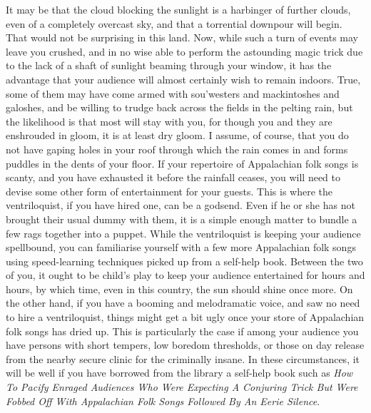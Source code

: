 It may be that the cloud blocking the sunlight is a harbinger of further clouds, even of a completely overcast sky, and that a torrential downpour will begin. That would not be surprising in this land. Now, while such a turn of events may leave you crushed, and in no wise able to perform the astounding magic trick due to the lack of a shaft of sunlight beaming through your window, it has the advantage that your audience will almost certainly wish to remain indoors. True, some of them may have come armed with sou'westers and mackintoshes and galoshes, and be willing to trudge back across the fields in the pelting rain, but the likelihood is that most will stay with you, for though you and they are enshrouded in gloom, it is at least dry gloom. I assume, of course, that you do not have gaping holes in your roof through which the rain comes in and forms puddles in the dents of your floor. If your repertoire of Appalachian folk songs is scanty, and you have exhausted it before the rainfall ceases, you will need to devise some other form of entertainment for your guests. This is where the ventriloquist, if you have hired one, can be a godsend. Even if he or she has not brought their usual dummy with them, it is a simple enough matter to bundle a few rags together into a puppet. While the ventriloquist is keeping your audience spellbound, you can familiarise yourself with a few more Appalachian folk songs using speed-learning techniques picked up from a self-help book. Between the two of you, it ought to be child's play to keep your audience entertained for hours and hours, by which time, even in this country, the sun should shine once more. On the other hand, if you have a booming and melodramatic voice, and saw no need to hire a ventriloquist, things might get a bit ugly once your store of Appalachian folk songs has dried up. This is particularly the case if among your audience you have persons with short tempers, low boredom thresholds, or those on day release from the nearby secure clinic for the criminally insane. In these circumstances, it will be well if you have borrowed from the library a self-help book such as \emph{How To Pacify Enraged Audiences Who Were Expecting A Conjuring Trick But Were Fobbed Off With Appalachian Folk Songs Followed By An Eerie Silence}.

